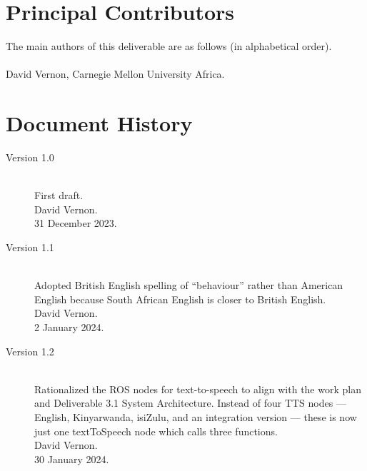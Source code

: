 \documentclass{CSSRforAfrica}
\newcommand{\blank}{~\\}
\begin{document}
%



\pagebreak
\section*{Principal Contributors}
\label{contributors}
The main authors of this deliverable are as follows (in alphabetical order).
\blank
~
\blank
David Vernon, Carnegie Mellon University Africa.\\   
  

\newpage
\section*{Document History}
\label{document_history}

\begin{description}

\item [Version 1.0]~\\
First draft. \\
David Vernon. \\                          
31 December 2023.

\item [Version 1.1]~\\
Adopted British English spelling of ``behaviour'' rather than American English because South African English is closer to British English. \\
David Vernon. \\                          
2 January 2024.

\item [Version 1.2]~\\
Rationalized the ROS nodes for text-to-speech to align with the work plan and Deliverable 3.1 System Architecture. Instead of four TTS nodes --- English, Kinyarwanda,  isiZulu, and an integration version --- these is now just one {\sf textToSpeech} node which calls three functions. \\
David Vernon.\\
30 January 2024.

\end{description}
\end{document}
